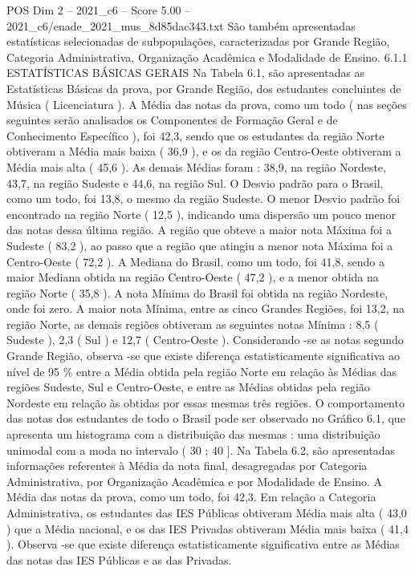 \begin{textsample}{POS Dim 2 – 2021\_c6 – Score 5.00 – 2021\_c6/enade\_2021\_mus\_8d85dac343.txt}
São também apresentadas estatísticas selecionadas de subpopulações, caracterizadas por Grande Região, Categoria Administrativa, Organização Acadêmica e Modalidade de Ensino. 6.1.1 ESTATÍSTICAS BÁSICAS GERAIS Na Tabela 6.1, são apresentadas as Estatísticas Básicas da prova, por Grande Região, dos estudantes concluintes de Música ( Licenciatura ).
A Média das notas da prova, como um todo ( nas seções seguintes serão analisados os Componentes de Formação Geral e de Conhecimento Específico ), foi 42,3, sendo que os estudantes da região Norte obtiveram a Média mais baixa ( 36,9 ), e os da região Centro-Oeste obtiveram a Média mais alta ( 45,6 ).
As demais Médias foram : 38,9, na região Nordeste, 43,7, na região Sudeste e 44,6, na região Sul.
O Desvio padrão para o Brasil, como um todo, foi 13,8, o mesmo da região Sudeste.
O menor Desvio padrão foi encontrado na região Norte ( 12,5 ), indicando uma dispersão um pouco menor das notas dessa última região.
A região que obteve a maior nota Máxima foi a Sudeste ( 83,2 ), ao passo que a região que atingiu a menor nota Máxima foi a Centro-Oeste ( 72,2 ).
A Mediana do Brasil, como um todo, foi 41,8, sendo a maior Mediana obtida na região Centro-Oeste ( 47,2 ), e a menor obtida na região Norte ( 35,8 ).
A nota Mínima do Brasil foi obtida na região Nordeste, onde foi zero.
A maior nota Mínima, entre as cinco Grandes Regiões, foi 13,2, na região Norte, as demais regiões obtiveram as seguintes notas Mínima : 8,5 ( Sudeste ), 2,3 ( Sul ) e 12,7 ( Centro-Oeste ).
Considerando -se as notas segundo Grande Região, observa -se que existe diferença estatisticamente significativa ao nível de 95 \% entre a Média obtida pela região Norte em relação às Médias das regiões Sudeste, Sul e Centro-Oeste, e entre as Médias obtidas pela região Nordeste em relação às obtidas por essas mesmas três regiões.
O comportamento das notas dos estudantes de todo o Brasil pode ser observado no Gráfico 6.1, que apresenta um histograma com a distribuição das mesmas : uma distribuição unimodal com a moda no intervalo ( 30 ; 40 ].
Na Tabela 6.2, são apresentadas informações referentes à Média da nota final, desagregadas por Categoria Administrativa, por Organização Acadêmica e por Modalidade de Ensino.
A Média das notas da prova, como um todo, foi 42,3.
Em relação a Categoria Administrativa, os estudantes das IES Públicas obtiveram Média mais alta ( 43,0 ) que a Média nacional, e os das IES Privadas obtiveram Média mais baixa ( 41,4 ).
Observa -se que existe diferença estatisticamente significativa entre as Médias das notas das IES Públicas e as das Privadas.

\end{textsample}
